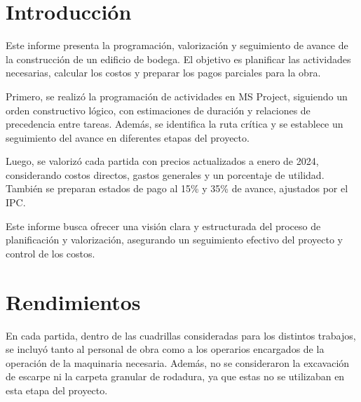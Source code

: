 \documentclass{article} %
\begin{document}
\newpage
\tableofcontents
\thispagestyle{plain} %
\thispagestyle{empty} %
\newpage

\setcounter{page}{1} %
\section{Introducción}
Este informe presenta la programación, valorización y seguimiento de avance de la construcción de un edificio de bodega. El objetivo es planificar las actividades necesarias, calcular los costos y preparar los pagos parciales para la obra.

Primero, se realizó la programación de actividades en MS Project, siguiendo un orden constructivo lógico, con estimaciones de duración y relaciones de precedencia entre tareas. Además, se identifica la ruta crítica y se establece un seguimiento del avance en diferentes etapas del proyecto.

Luego, se valorizó cada partida con precios actualizados a enero de 2024, considerando costos directos, gastos generales y un porcentaje de utilidad. También se preparan estados de pago al 15\% y 35\% de avance, ajustados por el IPC.

Este informe busca ofrecer una visión clara y estructurada del proceso de planificación y valorización, asegurando un seguimiento efectivo del proyecto y control de los costos.

\newpage
\section{Rendimientos}
En cada partida, dentro de las cuadrillas consideradas para los distintos trabajos, se incluyó tanto al personal de obra como a los operarios encargados de la operación de la maquinaria necesaria. Además, no se consideraron la excavación de escarpe ni la carpeta granular de rodadura, ya que estas no se utilizaban en esta etapa del proyecto.
\end{document}
